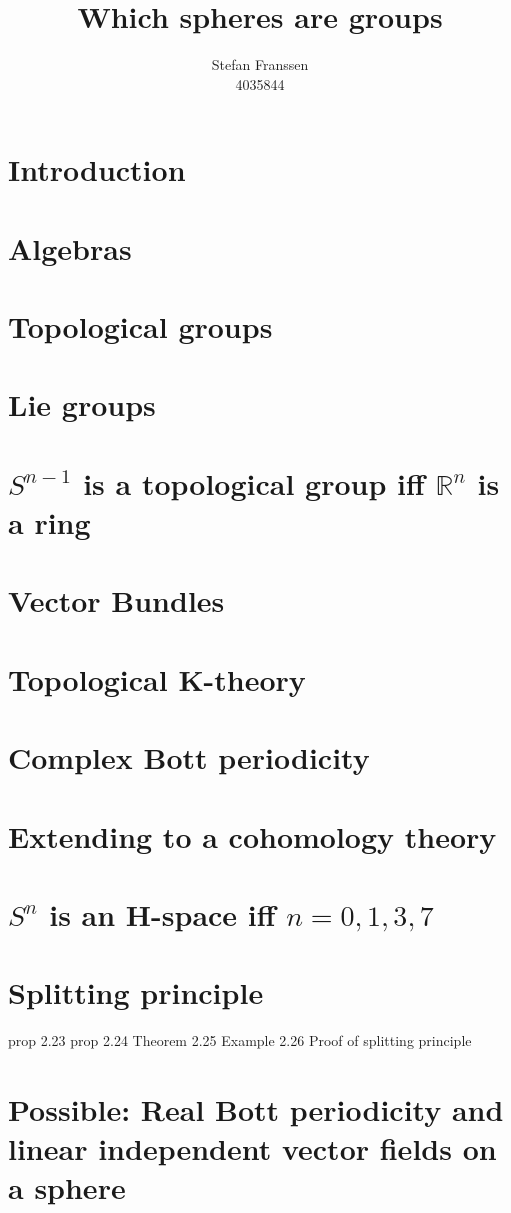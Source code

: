 \documentclass{report}
\title{Which spheres are groups}
\author{Stefan Franssen \\4035844}
\begin{document}
\maketitle
\tableofcontents{}
\chapter{Introduction}

\chapter{Algebras}

\chapter{Topological groups}

\chapter{Lie groups}

\chapter{$S^{n-1}$ is a topological group iff $\mathbb{R}^n$ is a ring}

\chapter{Vector Bundles}

\chapter{Topological K-theory}

\chapter{Complex Bott periodicity}

\chapter{Extending to a cohomology theory}

\chapter{$S^n$ is an H-space iff $n = 0,1,3,7$}

\chapter{Splitting principle}
prop 2.23
prop 2.24
Theorem 2.25
Example 2.26
Proof of splitting principle
\chapter{Possible: Real Bott periodicity and linear independent vector fields on a sphere}
\end{document}
